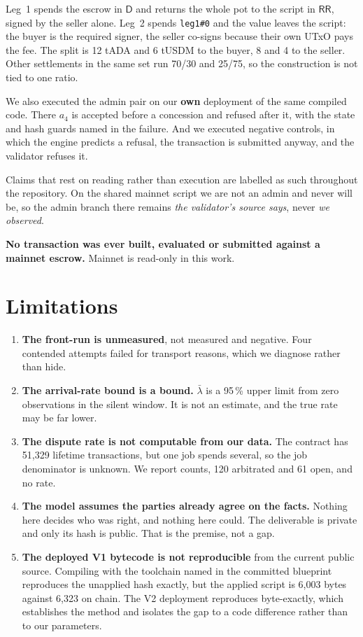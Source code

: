 \documentclass[11pt]{article}
\theoremstyle{remark}
\newcommand{\RR}{\mathsf{RR}}
\newcommand{\Dd}{\mathsf{D}}
\begin{document}
Leg~1 spends the escrow in $\Dd$ and returns the whole pot to the script in $\RR$, signed by the seller alone. Leg~2
spends \texttt{leg1\#0} and the value leaves the script: the buyer is the required signer, the seller co-signs
because their own UTxO pays the fee. The split is 12 tADA and 6 tUSDM to the buyer, 8 and 4 to the seller. Other
settlements in the same set run 70/30 and 25/75, so the construction is not tied to one ratio.

We also executed the admin pair on our \textbf{own} deployment of the same compiled code. There $a_4$ is accepted
before a concession and refused after it, with the state and hash guards named in the failure. And we executed
negative controls, in which the engine predicts a refusal, the transaction is submitted anyway, and the validator
refuses it.

Claims that rest on reading rather than execution are labelled as such throughout the repository. On the shared
mainnet script we are not an admin and never will be, so the admin branch there remains \emph{the validator's source
says}, never \emph{we observed}.

\begin{caveat}
\textbf{No transaction was ever built, evaluated or submitted against a mainnet escrow.} Mainnet is read-only in this
work.
\end{caveat}

\section{Limitations}

\begin{enumerate}[leftmargin=*]
\item \textbf{The front-run is unmeasured}, not measured and negative. Four contended attempts failed for transport
reasons, which we diagnose rather than hide.
\item \textbf{The arrival-rate bound is a bound.} $\bar\lambda$ is a 95\,\% upper limit from zero observations in the
silent window. It is not an estimate, and the true rate may be far lower.
\item \textbf{The dispute rate is not computable from our data.} The contract has 51{,}329 lifetime transactions, but
one job spends several, so the job denominator is unknown. We report counts, 120 arbitrated and 61 open, and no rate.
\item \textbf{The model assumes the parties already agree on the facts.} Nothing here decides who was right, and
nothing here could. The deliverable is private and only its hash is public. That is the premise, not a gap.
\item \textbf{The deployed V1 bytecode is not reproducible} from the current public source. Compiling with the
toolchain named in the committed blueprint reproduces the unapplied hash exactly, but the applied script is 6{,}003
bytes against 6{,}323 on chain. The V2 deployment reproduces byte-exactly, which establishes the method and isolates
the gap to a code difference rather than to our parameters.
\end{enumerate}
\end{document}
